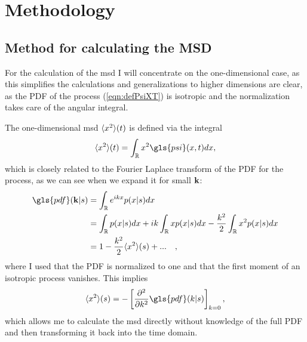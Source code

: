 \chapter{Methodology}

\section{Method for calculating the MSD} 

For the calculation of the \gls{msd} I will concentrate on the one-dimensional case, as this simplifies the calculations and generalizations to higher dimensions are clear, as the \gls{PDF} of the process (\ref{eqn:defPsiXT}) is isotropic and the normalization takes care of the angular integral. 

The one-dimensional \gls{msd} $\langle x^2 \rangle(t)$ is defined via the integral 
%
\begin{align}
\mean{x^2}(t) = \int_{\mathbb{R}} x^2 \gls{psi}(x,t) dx ,
\end{align}
%
which is closely related to the Fourier Laplace transform of the \gls{PDF} for the process, as we can see when we expand it for small $\mathbf{ k }$:
%
\begin{align}
\gls{pdf}(\ve{k}|s) &= \int_{\mathbb{R}}  e^{ik x} p(x|s) dx  \\
&= \int_{\mathbb{R}}   p(x|s) dx +  i k \int_{\mathbb{R}}   x p(x|s) dx - \frac{k^2}{2} \int_{\mathbb{R}}   x^2 p(x|s) dx \\
&= 1 - \frac{k^2}{2} \mean{x^2}(s)  + ... \quad ,
\end{align}
%
where I used that the \gls{PDF} is normalized to one and that the first moment of an isotropic process vanishes. This implies 
%
\begin{align}
\mean{x^2}(s) = - \left[ \npder{}{k}{2} \gls{pdf}(k|s) \right]_{k=0},
\end{align}
%
which allows me to calculate the \gls{msd} directly without knowledge of the full \gls{PDF} and then transforming it back into the time domain.

